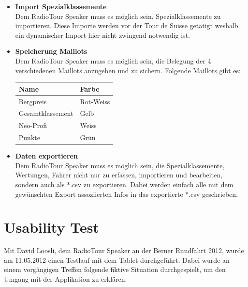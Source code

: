 \begin{itemize}
\item \textbf{Import Spezialklassemente}\\
Dem RadioTour Speaker muss es möglich sein, Spezialklassemente zu importieren. Diese Importe werden vor der Tour de Suisse getätigt weshalb ein dynamischer Import hier nicht zwingend notwendig ist.

\item \textbf{Speicherung Maillots}\\
Dem RadioTour Speaker muss es möglich sein, die Belegung der 4 verschiedenen Maillots anzugeben und zu sichern. Folgende Maillots gibt es:

\begin{center}
  \begin{tabular}{ l | l  }
    \hline
    Name & Farbe \\ \hline
    \hline
    Bergpreis & Rot-Weiss \\ \hline
    Gesamtklassement & Gelb \\ \hline
    Neo-Profi & Weiss \\ \hline
    Punkte & Grün\\

    \hline
  \end{tabular}
\end{center}


\item \textbf{Daten exportieren}\\
Dem RadioTour Speaker muss es möglich sein, die Spezialklassemente, Wertungen, Fahrer nicht nur zu erfassen, importieren und bearbeiten, sondern auch als *.csv zu exportieren. Dabei werden einfach alle mit dem gewünschten Export assoziierten Infos in das exportierte *.csv geschrieben.

\end{itemize}

\section{Usability Test}
\label{ref:usability}
Mit David Loosli, dem RadioTour Speaker an der Berner Rundfahrt 2012, wurde am 11.05.2012 einen Testlauf mit dem Tablet durchgeführt. Dabei wurde an einem vorgängigen Treffen folgende fiktive Situation durchgespielt, um den Umgang mit der Applikation zu erklären.

